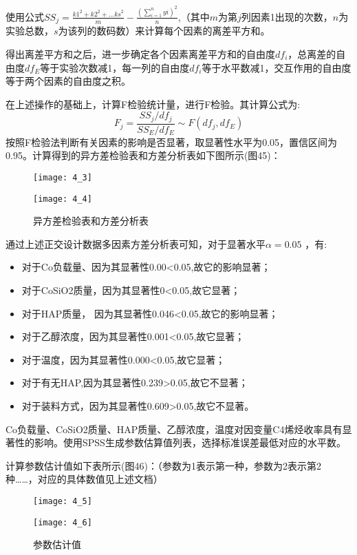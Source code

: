 \documentclass[withoutpreface,bwprint]{cumcmthesis} %
\begin{document}
使用公式${SS}_j=\frac{{k1}^2+{k2}^2+...{ks}^2}{m}-\frac{(\sum_{i=1}^{n}yi)^2}{n}$,（其中$m$为第$j$列因素1出现的次数，$n$为实验总数，$s$为该列的数码数）来计算每个因素的离差平方和。

得出离差平方和之后，进一步确定各个因素离差平方和的自由度${df}_i$，总离差的自由度${df}_E$等于实验次数减1，每一列的自由度${df}_i$等于水平数减1，交互作用的自由度等于两个因素的自由度之积。

在上述操作的基础上，计算F检验统计量，进行F检验。其计算公式为:
\begin{equation}
		F_{j}=\frac{S S_{j} / d f_{j}}{S S_{E} / d f_{E}} \sim F\left(d f_{j}, d f_{E}\right)
\end{equation}
按照F检验法判断有关因素的影响是否显著，取显著性水平为0.05，置信区间为0.95。计算得到的异方差检验表和方差分析表如下图所示(图45)：
\begin{figure}[!h]
	\centering
	\begin{minipage}[c]{0.48\textwidth}
		\centering
		\texttt{[image: 4\_3]}
	\end{minipage}
	\begin{minipage}[c]{0.48\textwidth}
		\centering
		\texttt{[image: 4\_4]}
	\end{minipage}
	\caption{异方差检验表和方差分析表}
\end{figure}

\newpage
通过上述正交设计数据多因素方差分析表可知，对于显著水平$\alpha=0.05$  ，有:
\begin{itemize}
	\item 对于Co负载量、因为其显著性0.00<0.05,故它的影响显著；
	\item 对于CoSiO2质量，因为其显著性0<0.05,故它显著；
	\item 对于HAP质量， 因为其显著性0.046<0.05,故它的影响显著；
	\item 对于乙醇浓度，因为其显著性0.001<0.05,故它显著；
	\item 对于温度，因为其显著性0.000<0.05,故它显著；
	\item 对于有无HAP,因为其显著性0.239>0.05,故它不显著；
	\item 对于装料方式，因为其显著性0.609>0.05,故它不显著。	
\end{itemize}

Co负载量、CoSiO2质量、HAP质量、乙醇浓度，温度对因变量C4烯烃收率具有显著性的影响。使用SPSS生成参数估算值列表，选择标准误差最低对应的水平数。

计算参数估计值如下表所示(图46)：（参数为1表示第一种，参数为2表示第2种……，对应的具体数值见上述文档）
\begin{figure}[!h]
	\centering
	\begin{minipage}[c]{0.48\textwidth}
		\centering
		\texttt{[image: 4\_5]}
	\end{minipage}
	\begin{minipage}[c]{0.48\textwidth}
		\centering
		\texttt{[image: 4\_6]}
	\end{minipage}
	\caption{参数估计值}
\end{figure}
\end{document}
